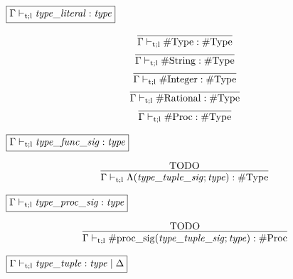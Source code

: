 $\fbox{$\Gamma \vdash_{\mathrm{t}; \mathrm{l}} \mathit{type\_literal}: \mathit{type}$}$

\begin{gather*}
    \infer{\Gamma \vdash_{\mathrm{t}; \mathrm{l}} \mathrm{\#Type}: \mathrm{\#Type}}{}
    \\
    \infer{\Gamma \vdash_{\mathrm{t}; \mathrm{l}} \mathrm{\#String}: \mathrm{\#Type}}{}
    \\
    \infer{\Gamma \vdash_{\mathrm{t}; \mathrm{l}} \mathrm{\#Integer}: \mathrm{\#Type}}{}
    \\
    \infer{\Gamma \vdash_{\mathrm{t}; \mathrm{l}} \mathrm{\#Rational}: \mathrm{\#Type}}{}
    \\
    \infer{\Gamma \vdash_{\mathrm{t}; \mathrm{l}} \mathrm{\#Proc}: \mathrm{\#Type}}{}
\end{gather*}

$\fbox{$\Gamma \vdash_{\mathrm{t}; \mathrm{l}} \mathit{type\_func\_sig}: \mathit{type}$}$

\begin{gather*}
    \infer{\Gamma \vdash_{\mathrm{t}; \mathrm{l}} \Lambda(\mathit{type\_tuple\_sig}; \mathit{type}): \mathrm{\#Type}}{
        \text{TODO}
    }
\end{gather*}

$\fbox{$\Gamma \vdash_{\mathrm{t}; \mathrm{l}} \mathit{type\_proc\_sig}: \mathit{type}$}$

\begin{gather*}
    \infer{\Gamma \vdash_{\mathrm{t}; \mathrm{l}} \mathrm{\#proc\_sig}(\mathit{type\_tuple\_sig}; \mathit{type}): \mathrm{\#Proc}}{
        \text{TODO}
    }
\end{gather*}

$\fbox{$\Gamma \vdash_{\mathrm{t}; \mathrm{l}} \mathit{type\_tuple}: \mathit{type} \mid \Delta$}$

